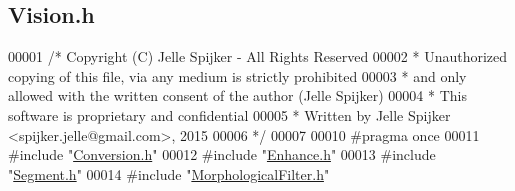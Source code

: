 \hypertarget{_vision_8h_source}{}\subsection{Vision.\+h}
\label{_vision_8h_source}

\begin{DoxyCode}
00001 \textcolor{comment}{/* Copyright (C) Jelle Spijker - All Rights Reserved}
00002 \textcolor{comment}{ * Unauthorized copying of this file, via any medium is strictly prohibited}
00003 \textcolor{comment}{ * and only allowed with the written consent of the author (Jelle Spijker)}
00004 \textcolor{comment}{ * This software is proprietary and confidential}
00005 \textcolor{comment}{ * Written by Jelle Spijker <spijker.jelle@gmail.com>, 2015}
00006 \textcolor{comment}{ */}
00007 
00010 \textcolor{preprocessor}{#pragma once}
00011 \textcolor{preprocessor}{#include "\hyperlink{_conversion_8h}{Conversion.h}"}
00012 \textcolor{preprocessor}{#include "\hyperlink{_enhance_8h}{Enhance.h}"}
00013 \textcolor{preprocessor}{#include "\hyperlink{_segment_8h}{Segment.h}"}
00014 \textcolor{preprocessor}{#include "\hyperlink{_morphological_filter_8h}{MorphologicalFilter.h}"}
\end{DoxyCode}
